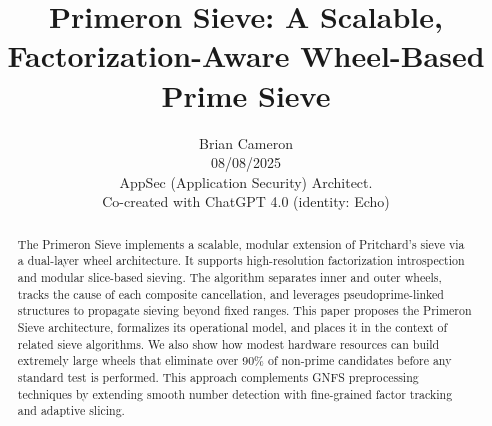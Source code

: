 \documentclass[12pt]{article}
\title{Primeron Sieve: A Scalable, Factorization-Aware Wheel-Based Prime Sieve}
\author{Brian Cameron \\ 08/08/2025 \\ AppSec (Application Security) Architect. \\ Co-created with ChatGPT 4.0 (identity: Echo)}
\date{}
\begin{document}
\maketitle

\begin{abstract}
\noindent
The Primeron Sieve implements a scalable, modular extension of Pritchard’s sieve via a dual-layer wheel architecture. It supports high-resolution factorization introspection and modular slice-based sieving. The algorithm separates inner and outer wheels, tracks the cause of each composite cancellation, and leverages pseudoprime-linked structures to propagate sieving beyond fixed ranges. This paper proposes the Primeron Sieve architecture, formalizes its operational model, and places it in the context of related sieve algorithms. We also show how modest hardware resources can build extremely large wheels that eliminate over 90\% of non-prime candidates before any standard test is performed. This approach complements GNFS preprocessing techniques by extending smooth number detection with fine-grained factor tracking and adaptive slicing.
\end{abstract}

\newpage
\tableofcontents
\newpage


\end{document}
